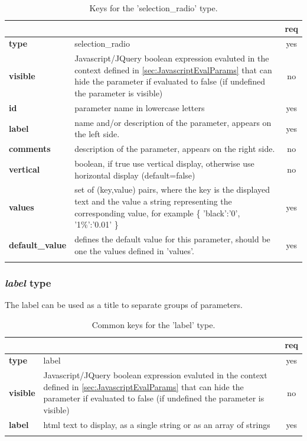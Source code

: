\begin{longtable}{|>{\bf}L{\linewidth}|L{\linewidth}|c|}
\hline
      &  & {\bf req} 
\tabularnewline \hline \hline
 type     & selection\_radio    & yes \\ \hline
 visible  & Javascript/JQuery boolean expression evaluted in the context defined 
              in \ref{sec:JavascriptEvalParams} that can hide the parameter if
            evaluated to false (if undefined the parameter is visible)& no \\ \hline
 id       & parameter name in lowercase letters & yes \\ \hline
 label  & name and/or description of the parameter, appears on the left side. & yes
                      \\ \hline
 comments & description of the parameter, appears on the right side. & no
                      \\ \hline
 vertical & boolean, if true use vertical display, otherwise use horizontal
            display (default=false) & no \\ \hline
 values   & set of (key,value) pairs, where the key is the displayed text and the 
value a string representing the corresponding value, for example \{ 
'black':'0', '1\%':'0.01' \} & yes
                      \\ \hline
 default\_value & defines the default value for this parameter, should be one 
the values defined in 'values'. & yes \\ \hline
\caption{Keys for the 'selection\_radio' type.}
\end{longtable}

\subsubsection{ \emph{label} type}

The label  can be used as a title to separate groups of parameters.

\begin{longtable}{|>{\bf}L{\linewidth}|L{\linewidth}|c|}
\hline
      &  & {\bf req} 
\tabularnewline \hline \hline
 type  & label       & yes \\ \hline
 visible  & Javascript/JQuery boolean expression evaluted in the context defined 
              in \ref{sec:JavascriptEvalParams} that can hide the parameter if
            evaluated to false (if undefined the parameter is visible)& no \\ \hline
 label & html text to display, as a single string or as an array of strings& yes
                      \\ \hline
\caption{Common keys for the 'label' type.}
\end{longtable}


